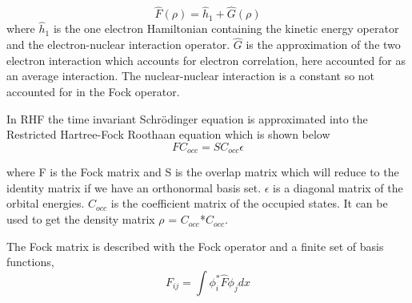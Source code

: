 \documentclass[twoside]{article}
\begin{document}
\[
\hat{F}(\rho) = \hat{h}_1 + \hat{G}(\rho)
\]
where $\hat{h}_1$ is the one electron Hamiltonian containing the kinetic energy operator and the electron-nuclear interaction operator. $\hat{G}$ is the approximation of the two electron interaction which accounts for electron correlation, here accounted for as an average interaction. The nuclear-nuclear interaction is a constant so not accounted for in the Fock operator. 

In RHF the time invariant Schr\"{o}dinger equation is approximated into the Restricted Hartree-Fock Roothaan equation which is shown below
\[
FC_{occ} = SC_{occ}\epsilon
\]



where F is the Fock matrix and S is the overlap matrix which will reduce to the identity matrix if we have an orthonormal basis set. $\epsilon$ is a diagonal matrix of the orbital energies. $C_{occ}$ is the coefficient matrix of the occupied states. It can be used to get the density matrix $\rho$ =  $C_{occ}$*$C_{occ}$.

The Fock matrix is described with the Fock operator and a finite set of basis functions,
\[
F_{ij} = \int \phi_i^*\hat{F}\phi_j dx
\]






\end{document}
